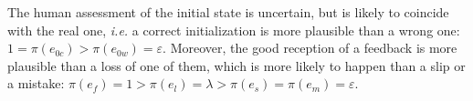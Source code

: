 

The human assessment of the initial state is uncertain, 
but is likely to coincide with the real one, 
\textit{i.e.} a correct initialization is more plausible 
than a wrong one: $1=\pi(e_{0c})>\pi(e_{0w})=\varepsilon$.
Moreover, the good reception of a feedback is more plausible 
than a loss of one of them, 
which is more likely to happen than a slip or a mistake: 
$\pi(e_f) = 1 > \pi(e_l) = \lambda > \pi(e_s) = \pi(e_m) = \varepsilon$.

